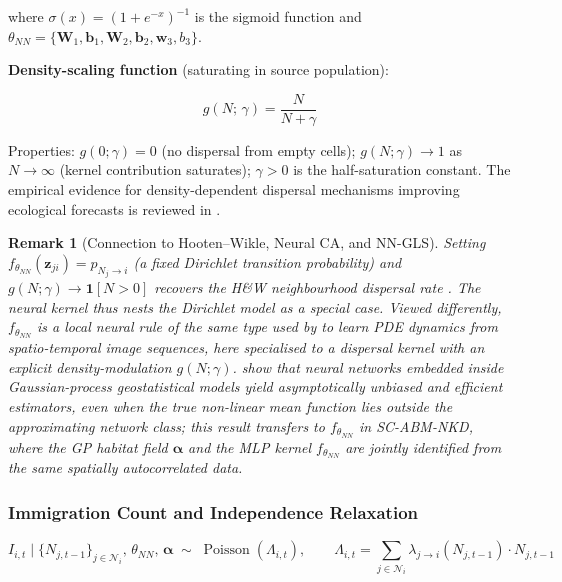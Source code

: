 \documentclass[12pt,a4paper]{article}
\newtheorem{remark}{Remark}
\theoremstyle{definition}
\newcommand{\Pois}{\operatorname{Poisson}}
\newcommand{\bz}{\bm{z}}
\newcommand{\bW}{\bm{W}}
\newcommand{\balpha}{\bm{\alpha}}
\newcommand{\bw}{\bm{w}}
\newcommand{\Ni}{\mathcal{N}_i}
\newcommand{\nn}{f_{\theta_{NN}}}
\begin{document}
where $\sigma(x) = (1+e^{-x})^{-1}$ is the sigmoid function and
$\theta_{NN} = \{\bW_1, \bm{b}_1, \bW_2, \bm{b}_2, \bw_3, b_3\}$.

\noindent\textbf{Density-scaling function} (saturating in source population):

\begin{equation}
  g(N;\, \gamma) = \frac{N}{N + \gamma}
  \label{eq:density-scale}
\end{equation}

Properties: $g(0;\gamma)=0$ (no dispersal from empty cells); $g(N;\gamma)\to 1$
as $N\to\infty$ (kernel contribution saturates);
$\gamma > 0$ is the half-saturation constant.
The empirical evidence for density-dependent dispersal mechanisms
improving ecological forecasts is reviewed in \citet{pletcher2025}.

\begin{remark}[Connection to Hooten--Wikle, Neural CA, and NN-GLS]
Setting $\nn(\bz_{ji}) = p_{N_j\to i}$ (a fixed Dirichlet transition
probability) and $g(N;\gamma) \to \mathbf{1}[N>0]$ recovers the H\&W
neighbourhood dispersal rate \citep{hooten2010}.  The neural kernel thus nests the Dirichlet model
as a special case.  Viewed differently, $\nn$ is a local neural rule
of the same type used by \citet{richardson2024} to learn PDE dynamics
from spatio-temporal image sequences, here specialised to a dispersal
kernel with an explicit density-modulation $g(N;\gamma)$.
\citet{zhan2025} show that neural networks embedded inside Gaussian-process
geostatistical models yield asymptotically unbiased and efficient estimators,
even when the true non-linear mean function lies outside the approximating
network class; this result transfers to $\nn$ in SC-ABM-NKD, where the
GP habitat field $\balpha$ and the MLP kernel $\nn$ are jointly identified
from the same spatially autocorrelated data.
\end{remark}

\subsubsection{Immigration Count and Independence Relaxation}

\begin{keybox}
\begin{equation}
  I_{i,t} \;\Big|\; \{N_{j,t-1}\}_{j\in\Ni},\, \theta_{NN},\, \balpha
  \;\sim\;
  \Pois\!\left(\Lambda_{i,t}\right),
  \qquad
  \Lambda_{i,t} = \sum_{j\in\Ni} \lambda_{j\to i}(N_{j,t-1}) \cdot N_{j,t-1}
  \label{eq:immigration}
\end{equation}
\end{keybox}
\end{document}
